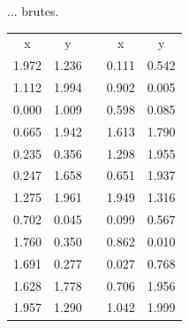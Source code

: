 \documentclass[french]{beamer}
\begin{document}
 \begin{frame}{... brutes.}
\begin{center}
	\begin{tabular}{|cc|c|cc|}
		x & y  &  & x & y \\ 
		1.972&1.236&&0.111&0.542 \\
		1.112&1.994&&0.902&0.005 \\
		0.000&1.009&&0.598&0.085 \\
		0.665&1.942&&1.613&1.790 \\
		0.235&0.356&&1.298&1.955 \\
		0.247&1.658&&0.651&1.937 \\
		1.275&1.961&&1.949&1.316 \\
		0.702&0.045&&0.099&0.567 \\
		1.760&0.350&&0.862&0.010 \\
		1.691&0.277&&0.027&0.768 \\
		1.628&1.778&&0.706&1.956 \\
		1.957&1.290&&1.042&1.999 \\
	\end{tabular} 
\end{center}
\end{frame}
\end{document}
